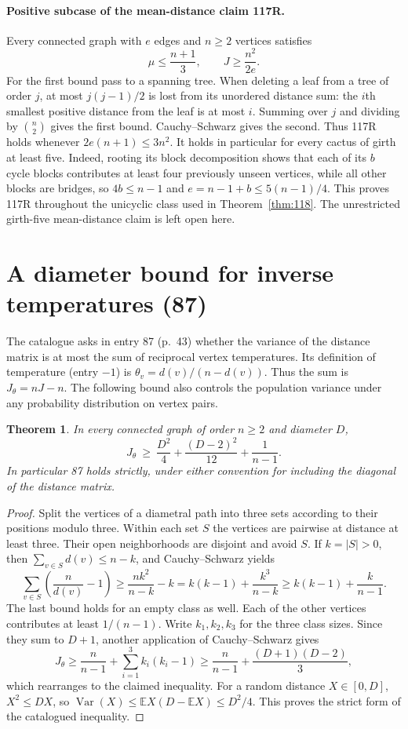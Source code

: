 \documentclass[11pt,a4paper]{article}
\newtheorem{theorem}{Theorem}[section]
\theoremstyle{remark}\newtheorem*{remark}{Remark}
\begin{document}
\paragraph{Positive subcase of the mean-distance claim 117R.}
Every connected graph with $e$ edges and $n\ge2$ vertices satisfies
\[
 \mu\le\frac{n+1}{3},\qquad J\ge\frac{n^2}{2e}.
\]
For the first bound pass to a spanning tree. When deleting a leaf from a tree of order $j$, at most $j(j-1)/2$ is lost from its unordered distance sum: the $i$th smallest positive distance from the leaf is at most $i$. Summing over $j$ and dividing by $\binom n2$ gives the first bound. Cauchy--Schwarz gives the second. Thus 117R holds whenever $2e(n+1)\le3n^2$. It holds in particular for every cactus of girth at least five. Indeed, rooting its block decomposition shows that each of its $b$ cycle blocks contributes at least four previously unseen vertices, while all other blocks are bridges, so $4b\le n-1$ and $e=n-1+b\le5(n-1)/4$. This proves 117R throughout the unicyclic class used in Theorem~\ref{thm:118}. The unrestricted girth-five mean-distance claim is left open here.

\section{A diameter bound for inverse temperatures (87)}\label{sec:87inverse}
The catalogue asks in entry 87 (p.~43) whether the variance of the distance matrix is at most the sum of reciprocal vertex temperatures. Its definition of temperature (entry $-1$) is $\theta_v=d(v)/(n-d(v))$. Thus the sum is $J_{\theta}=nJ-n$. The following bound also controls the population variance under any probability distribution on vertex pairs.
\begin{theorem}\label{thm:temperature}
In every connected graph of order $n\ge2$ and diameter $D$,
\[
 J_{\theta}\ \ge\ \frac{D^2}{4}+\frac{(D-2)^2}{12}+\frac1{n-1}.
\]
In particular 87 holds strictly, under either convention for including the diagonal of the distance matrix.
\end{theorem}
\begin{proof}
Split the vertices of a diametral path into three sets according to their positions modulo three. Within each set $S$ the vertices are pairwise at distance at least three. Their open neighborhoods are disjoint and avoid $S$. If $k=|S|>0$, then $\sum_{v\in S} d(v)\le n-k$, and Cauchy--Schwarz yields
\[
 \sum_{v\in S}\left(\frac{n}{d(v)}-1\right)
 \ge \frac{nk^2}{n-k}-k
 = k(k-1)+\frac{k^3}{n-k}
 \ge k(k-1)+\frac{k}{n-1}.
\]
The last bound holds for an empty class as well. Each of the other vertices contributes at least $1/(n-1)$. Write $k_1,k_2,k_3$ for the three class sizes. Since they sum to $D+1$, another application of Cauchy--Schwarz gives
\[
 J_{\theta}\ge\frac{n}{n-1}+\sum_{i=1}^3k_i(k_i-1)
 \ge\frac{n}{n-1}+\frac{(D+1)(D-2)}3,
\]
which rearranges to the claimed inequality. For a random distance $X\in[0,D]$, $X^2\le DX$, so $\operatorname{Var}(X)\le \mathbb EX(D-\mathbb EX)\le D^2/4$. This proves the strict form of the catalogued inequality.
\end{proof}
\end{document}
